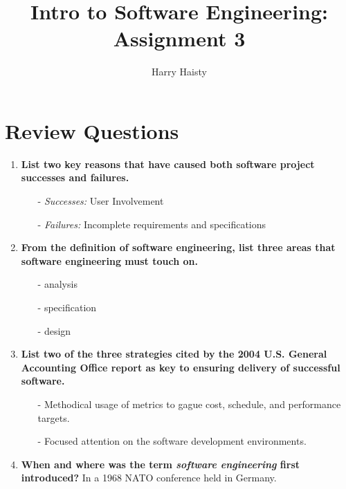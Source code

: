 \documentclass[11pt]{article}
\title{Intro to Software Engineering: Assignment 3}
\author{Harry Haisty}
\begin{document}
\maketitle
\section*{Review Questions}
\begin{enumerate}
    \item \textbf{List two key reasons that have caused both software project successes and failures.}
    \begin{itemize}
        \item[-] \textit{Successes:} User Involvement
        \item[-] \textit{Failures:} Incomplete requirements and specifications
    \end{itemize}
    
    \item \textbf{From the definition of software engineering, list three areas that software engineering must touch on. }
    \begin{itemize}
        \item[-] analysis
        \item[-] specification
        \item[-] design
    \end{itemize}
    
    \item \textbf{List two of the three strategies cited by the 2004 U.S. General Accounting Office report as key to ensuring delivery of successful software.}
    \begin{itemize}
        \item [-] Methodical usage of metrics to gague cost, schedule, and performance targets. 
        \item [-] Focused attention on the software development environments.
    \end{itemize}
    
    \item \textbf{When and where was the term \textit{software engineering} first introduced?}
    \newline
    In a 1968 NATO conference held in Germany.
    

\end{enumerate}
\end{document}
